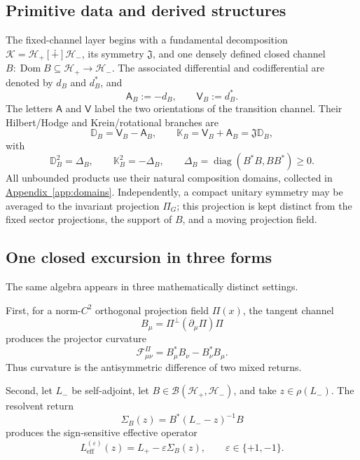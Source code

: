 \documentclass[11pt,reqno]{scrartcl}
\newcommand{\scrK}{\mathscr K}
\newcommand{\scrHp}{\mathscr H_{+}}
\newcommand{\scrHm}{\mathscr H_{-}}
\newcommand{\fundJ}{\mathfrak J}
\newcommand{\Aop}{\mathsf A}
\newcommand{\Vop}{\mathsf V}
\newcommand{\DB}{\mathbb D}
\newcommand{\KB}{\mathbb K}
\newcommand{\DeltaB}{\Delta}
\DeclareMathOperator{\Dom}{Dom}
\DeclareMathOperator{\diag}{diag}
\newcommand{\dsum}{\mathbin{[\dotplus]}}
\newcommand{\gaugeF}{\mathcal F}
\theoremstyle{plain}
\theoremstyle{definition}
\theoremstyle{remark}
\begin{document}
\subsection{Primitive data and derived structures}

The fixed-channel layer begins with a fundamental decomposition
\(\scrK=\scrHp\dsum\scrHm\), its symmetry \(\fundJ\), and one densely
defined closed channel
\(B:\Dom B\subseteq\scrHp\to\scrHm\).  The associated differential and
codifferential are denoted by \(d_B\) and \(d_B^*\), and
\begin{equation}
  \Aop_B:=-d_B,
  \qquad
  \Vop_B:=d_B^*.
  \label{eq:intro-AV}
\end{equation}
The letters \(\Aop\) and \(\Vop\) label the two orientations of the
transition channel.  Their Hilbert/Hodge and Krein/rotational branches are
\begin{equation}
  \DB_B=\Vop_B-\Aop_B,
  \qquad
  \KB_B=\Vop_B+\Aop_B=\fundJ\DB_B,
\end{equation}
with
\begin{equation}
  \DB_B^2=\DeltaB_B,
  \qquad
  \KB_B^2=-\DeltaB_B,
  \qquad
  \DeltaB_B=\diag(B^*B,BB^*)\ge0.
\end{equation}
All unbounded products use their natural composition domains, collected in
\hyperref[app:domains]{Appendix~\ref*{app:domains}}.  Independently, a compact unitary symmetry may be
averaged to the invariant projection \(\Pi_G\); this projection is kept
distinct from the fixed sector projections, the support of \(B\), and a
moving projection field.

\subsection{One closed excursion in three forms}

The same algebra appears in three mathematically distinct settings.

First, for a norm-\(C^2\) orthogonal projection field \(\Pi(x)\), the tangent
channel
\begin{equation}
  B_\mu=\Pi^\perp(\partial_\mu\Pi)\Pi
\end{equation}
produces the projector curvature
\begin{equation}
  \gaugeF_{\mu\nu}^{\Pi}
  =B_\mu^*B_\nu-B_\nu^*B_\mu.
  \label{eq:intro-curvature}
\end{equation}
Thus curvature is the antisymmetric difference of two mixed returns.

Second, let \(L_-\) be self-adjoint, let
\(B\in\mathcal B(\scrHp,\scrHm)\), and take \(z\in\rho(L_-)\).  The
resolvent return
\begin{equation}
  \Sigma_B(z)=B^*(L_--z)^{-1}B
  \label{eq:intro-self-energy}
\end{equation}
produces the sign-sensitive effective operator
\begin{equation}
  L_{\mathrm{eff}}^{(\varepsilon)}(z)
  =L_+-\varepsilon\Sigma_B(z),
  \qquad \varepsilon\in\{+1,-1\}.
  \label{eq:intro-effective}
\end{equation}
\end{document}
